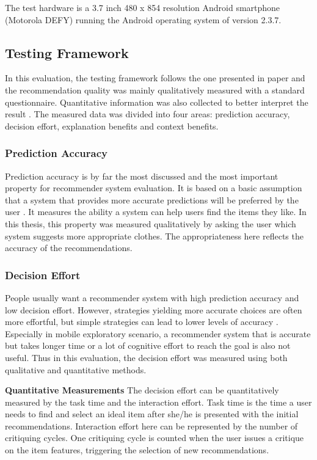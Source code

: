 The test hardware is a 3.7 inch 480 x 854 resolution Android smartphone (Motorola DEFY) running the Android operating system of version 2.3.7.

\subsection{Testing Framework} \label{sec:ts_tf}

In this evaluation, the testing framework follows the one presented in paper \cite{ref:5} and the recommendation quality was mainly qualitatively measured with a standard questionnaire. Quantitative information was also collected to better interpret the result \cite{ref:35, ref:46}. The measured data was divided into four areas: prediction accuracy, decision effort, explanation benefits and context benefits.

\subsubsection{Prediction Accuracy} \label{sec:ts_tf_pa}

Prediction accuracy is by far the most discussed and the most important property for recommender system evaluation. It is based on a basic assumption that a system that provides more accurate predictions will be preferred by the user \cite{ref:35}. It measures the ability a system can help users find the items they like. In this thesis, this property was measured qualitatively by asking the user which system suggests more appropriate clothes. The appropriateness here reflects the accuracy of the recommendations. 

\subsubsection{Decision Effort} \label{sec:ts_tf_de}

People usually want a recommender system with high prediction accuracy and low decision effort. However, strategies yielding more accurate choices are often more effortful, but simple strategies can lead to lower levels of accuracy \cite{ref:38}. Especially in mobile exploratory scenario, a recommender system that is accurate but takes longer time or a lot of cognitive effort to reach the goal is also not useful. Thus in this evaluation, the decision effort was measured using both qualitative and quantitative methods.

\textbf{Quantitative Measurements} The decision effort can be quantitatively measured by the task time and the interaction effort. Task time is the time a user needs to find and select an ideal item after she/he is presented with the initial recommendations. Interaction effort here can be represented by the number of critiquing cycles. One critiquing cycle is counted when the user issues a critique on the item features, triggering the selection of new recommendations.

